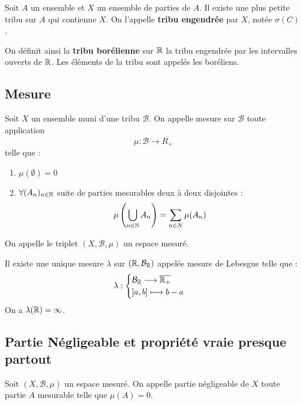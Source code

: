 \begin{proposition}
    Soit $A$ un ensemble et $X$ un ensemble de parties de $A$. Il existe une plus petite tribu sur 
    $A$ qui contienne $X$. On l'appelle \textbf{tribu engendrée} par $X$, notée $\sigma (C)$.

    On définit ainsi la \textbf{tribu borélienne} sur $\mathbb{R}$ la tribu engendrée par les intervalles ouverts de $\mathbb{R}$. 
    Les éléments de la tribu sont appelés les boréliens.
\end{proposition}

\newpage 
\subsection{Mesure}

\begin{definition}[Mesure]
    Soit $X$ un ensemble muni d'une tribu $ \mathcal{B}$. On appelle mesure sur $ \mathcal{B}$ toute application 
        \[ \mu : \mathcal{B} \longrightarrow \overline{R_+} \] 
    telle que : 
    \begin{enumerate}[label=\roman*)]
        \item $\mu (\emptyset) = 0 $
        \item $ \forall (A_n)_{n \in \mathbb{N}}$ suite de parties mesurables deux à deux disjointes :
            \[ \mu \left( \bigcup_{n \in \mathbb{N}} A_n \right) = \sum_{n \in N} \mu (A_n) \] 
    \end{enumerate}
    On appelle le triplet $(X, \mathcal{B}, \mu)$ un espace mesuré. 
\end{definition}

\begin{theorem}
    Il existe une unique mesure $\lambda$ sur $(\mathbb{R}, \mathcal{B}_{\mathbb{R}})$ appelée mesure de Lebesgue telle que : 
        \[ \lambda : 
            \begin{cases}
                \mathcal{B}_{\mathbb{R}} \longrightarrow \overline{\mathbb{R}_+} \\ 
                ]a,b] \longmapsto b-a 
            \end{cases}
        \] 
    On a $\lambda(\mathbb{R}) = \infty$. 
\end{theorem}

\subsection{Partie Négligeable et propriété vraie presque partout}

\begin{definition}
    Soit $(X, \mathcal{B},\mu)$ un espace mesuré. On appelle partie négligeable de $X$ toute partie $A$ mesurable telle que 
    $\mu(A) = 0$. 
\end{definition}

